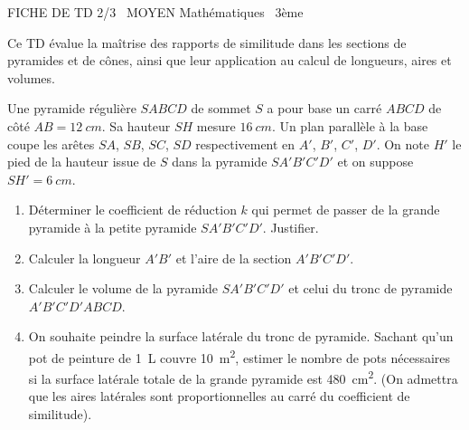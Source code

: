 \documentclass[11pt]{article}
\begin{document}
\begin{tcolorbox}[enhanced,colback=popink,colframe=popink,arc=10pt,boxrule=0pt,left=12pt,right=12pt,top=9pt,bottom=9pt]
{\color{white}\popxbold\small FICHE DE TD 2/3 \textbullet\ MOYEN \hfill Mathématiques \textbullet\ 3ème\par}
\end{tcolorbox}
\vspace{4pt}
Ce TD évalue la maîtrise des rapports de similitude dans les sections de pyramides et de cônes, ainsi que leur application au calcul de longueurs, aires et volumes.

\begin{exercice}
Une pyramide régulière $SABCD$ de sommet $S$ a pour base un carré $ABCD$ de côté $AB = \SI{12}{cm}$. Sa hauteur $SH$ mesure $\SI{16}{cm}$. Un plan parallèle à la base coupe les arêtes $SA$, $SB$, $SC$, $SD$ respectivement en $A'$, $B'$, $C'$, $D'$. On note $H'$ le pied de la hauteur issue de $S$ dans la pyramide $SA'B'C'D'$ et on suppose $SH' = \SI{6}{cm}$.
\begin{enumerate}
    \item Déterminer le coefficient de réduction $k$ qui permet de passer de la grande pyramide à la petite pyramide $SA'B'C'D'$. Justifier.
    \item Calculer la longueur $A'B'$ et l'aire de la section $A'B'C'D'$.
    \item Calculer le volume de la pyramide $SA'B'C'D'$ et celui du tronc de pyramide $A'B'C'D'ABCD$.
    \item On souhaite peindre la surface latérale du tronc de pyramide. Sachant qu'un pot de peinture de \SI{1}{L} couvre \SI{10}{m^2}, estimer le nombre de pots nécessaires si la surface latérale totale de la grande pyramide est \SI{480}{cm^2}. (On admettra que les aires latérales sont proportionnelles au carré du coefficient de similitude).
\end{enumerate}
\end{exercice}
\end{document}
